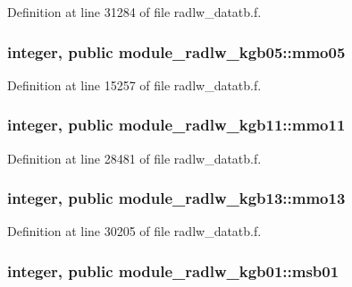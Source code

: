 Definition at line 31284 of file radlw\+\_\+datatb.\+f.

\subsubsection[{\texorpdfstring{mmo05}{mmo05}}]{\setlength{\rightskip}{0pt plus 5cm}integer, public module\+\_\+radlw\+\_\+kgb05\+::mmo05}\hypertarget{group__module__radlw__main_gaa552aae4878030144218ca6c2bbe417f}{}\label{group__module__radlw__main_gaa552aae4878030144218ca6c2bbe417f}


Definition at line 15257 of file radlw\+\_\+datatb.\+f.

\subsubsection[{\texorpdfstring{mmo11}{mmo11}}]{\setlength{\rightskip}{0pt plus 5cm}integer, public module\+\_\+radlw\+\_\+kgb11\+::mmo11}\hypertarget{group__module__radlw__main_ga6aabd24aa785ef8689c63b01aaaab243}{}\label{group__module__radlw__main_ga6aabd24aa785ef8689c63b01aaaab243}


Definition at line 28481 of file radlw\+\_\+datatb.\+f.

\subsubsection[{\texorpdfstring{mmo13}{mmo13}}]{\setlength{\rightskip}{0pt plus 5cm}integer, public module\+\_\+radlw\+\_\+kgb13\+::mmo13}\hypertarget{group__module__radlw__main_gae513ce55829a57a0dbda77f570e4a619}{}\label{group__module__radlw__main_gae513ce55829a57a0dbda77f570e4a619}


Definition at line 30205 of file radlw\+\_\+datatb.\+f.

\subsubsection[{\texorpdfstring{msb01}{msb01}}]{\setlength{\rightskip}{0pt plus 5cm}integer, public module\+\_\+radlw\+\_\+kgb01\+::msb01}\hypertarget{group__module__radlw__main_gae34d953adc793ad27a294864e3e0e354}{}\label{group__module__radlw__main_gae34d953adc793ad27a294864e3e0e354}


